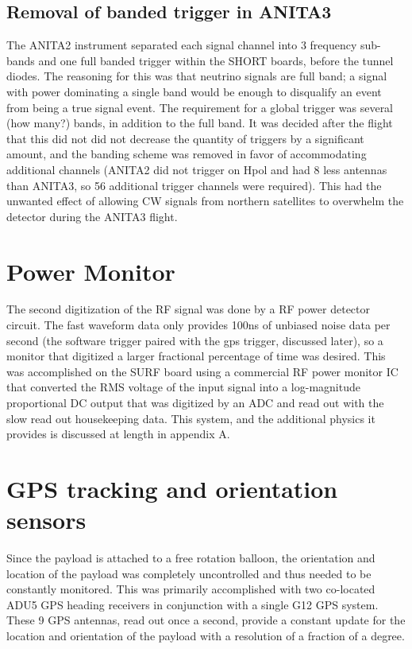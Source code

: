 	\subsection{Removal of banded trigger in ANITA3}
		The ANITA2 instrument separated each signal channel into 3 frequency sub-bands and one full banded trigger within the SHORT boards, before the tunnel diodes.  The reasoning for this was that neutrino signals are full band; a signal with power dominating a single band would be enough to disqualify an event from being a true signal event.  The requirement for a global trigger was several (how many?) bands, in addition to the full band.  It was decided after the flight that this did not did not decrease the quantity of triggers by a significant amount, and the banding scheme was removed in favor of accommodating additional channels (ANITA2 did not trigger on Hpol and had 8 less antennas than ANITA3, so 56 additional trigger channels were required).  This had the unwanted effect of allowing CW signals from northern satellites to overwhelm the detector during the ANITA3 flight.
		
\section{Power Monitor}
	The second digitization of the RF signal was done by a RF power detector circuit.  The fast waveform data only provides 100ns of unbiased noise data per second (the software trigger paired with the gps trigger, discussed later), so a monitor that digitized a larger fractional percentage of time was desired.  This was accomplished on the SURF board using a commercial RF power monitor IC that converted the RMS voltage of the input signal into a log-magnitude proportional DC output that was digitized by an ADC and read out with the slow read out housekeeping data.  This system, and the additional physics it provides is discussed at length in appendix A.
	
\section{GPS tracking and orientation sensors}
	Since the payload is attached to a free rotation balloon, the orientation and location of the payload was completely uncontrolled and thus needed to be constantly monitored.  This was primarily accomplished with two co-located ADU5 GPS heading receivers in conjunction with a single G12 GPS system.  These 9 GPS antennas, read out once a second, provide a constant update for the location and orientation of the payload with a resolution of a fraction of a degree.
